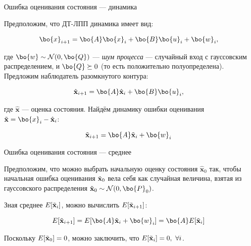 \documentclass{beamer}
\newcommand{\bhat}[1] {\hat{\mathbf{#1}}}
\newcommand{\btil}[1] {\Tilde{\mathbf{#1}}}
\begin{document}
\begin{frame}{Ошибка оценивания состояния — динамика}
	\begin{flushleft}
		
		Предположим, что ДТ-ЛПП динамика имеет вид:
		
		\begin{equation}
			\bo{x}_{i+1} = \bo{A} \bo{x}_i + \bo{B} \bo{u}_i + \bo{w}_i,
		\end{equation}
		
		где $\bo{w} \sim \mathcal{N} (0, \bo{Q})$ — \emph{шум процесса} — случайный вход с гауссовским распределением, и $\bo{Q} \succeq 0$ (то есть положительно полуопределена). Предложим наблюдатель разомкнутого контура:
		
		\begin{equation}
			\bhat{x}_{i+1} = \bo{A} \bhat{x}_i + \bo{B} \bo{u}_i, 
		\end{equation}
		
		где $\bhat{x}$ — оценка состояния. Найдём динамику ошибки оценивания $\btil{x} = \bo{x}_i - \bhat{x}_i$:
		
		\begin{equation}
			\btil{x}_{i+1} = \bo{A} \btil{x}_i + \bo{w}_i
		\end{equation}
		
	\end{flushleft}
\end{frame}



\begin{frame}{Ошибка оценивания состояния — среднее}
	\begin{flushleft}
		
		Предположим, что можно выбрать начальную оценку состояния $\bhat{x}_0$ так, чтобы начальная ошибка оценивания $\btil{x}_0$ вела себя как случайная величина, взятая из гауссовского распределения $\btil{x}_0 \sim \mathcal{N} (0, \bo{P}_0)$.
		
		\bigskip
		
		Зная среднее $E[\btil{x}_i]$, можно вычислить $E[\btil{x}_{i+1}]$:
		
		\begin{equation}
			E[\btil{x}_{i+1}] = E[\bo{A} \btil{x}_i + \bo{w}_i] = 
			\bo{A} E[\btil{x}_i]
		\end{equation}		
		
		Поскольку $E[\btil{x}_0] = 0$, можно заключить, что $E[\btil{x}_i] = 0, \ \forall i$.
		
		
	\end{flushleft}
\end{frame}
\end{document}
